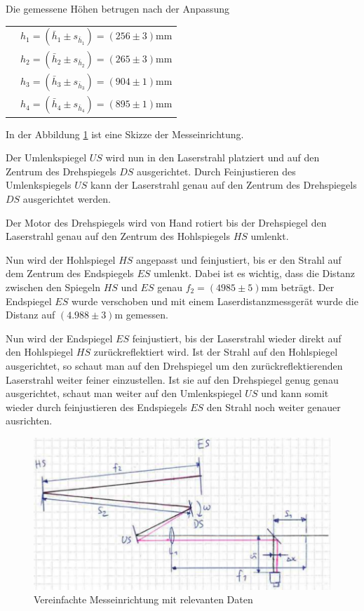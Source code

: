 Die gemessene H\"ohen betrugen nach der Anpassung

\begin{tabular}{ll}
    \hspace{4mm}
    & $h_1 = (\bar{h}_1 \pm s_{\bar{h}_1}) = (256\pm3)\textrm{mm}$ \\
    & $h_2 = (\bar{h}_2 \pm s_{\bar{h}_2}) = (265\pm3)\textrm{mm}$ \\
    & $h_3 = (\bar{h}_3 \pm s_{\bar{h}_3}) = (904\pm1)\textrm{mm}$ \\
    & $h_4 = (\bar{h}_4 \pm s_{\bar{h}_4}) = (895\pm1)\textrm{mm}$ \\
\end{tabular}

In   der   Abbildung   \ref{fig:setup}  ist  eine  Skizze  der  Messeinrichtung.

Der Umlenkspiegel $US$ wird nun in den Laserstrahl platziert und auf den Zentrum
des  Drehspiegels $DS$ ausgerichtet. Durch Feinjustieren des Umlenkspiegels $US$
kann  der  Laserstrahl  genau auf den Zentrum des Drehspiegels $DS$ ausgerichtet
werden.

Der  Motor  des  Drehspiegels  wird  von  Hand  rotiert  bis der Drehspiegel den
Laserstrahl   genau   auf   den   Zentrum   des   Hohlspiegels   $HS$   umlenkt.

Nun  wird der Hohlspiegel $HS$ angepasst und feinjustiert, bis er den Strahl auf
dem Zentrum des Endspiegels $ES$ umlenkt. Dabei ist es wichtig, dass die Distanz
zwischen  den  Spiegeln  $HS$  und  $ES$  genau  $f_2  =  (4985\pm5)\textrm{mm}$
betr\"agt.    Der    Endspiegel    $ES$   wurde   verschoben   und   mit   einem
Laserdistanzmessger\"at  wurde die Distanz auf $(4.988\pm3)\textrm{m}$ gemessen.

Nun wird der Endspiegel $ES$ feinjustiert, bis der Laserstrahl wieder direkt auf
den   Hohlspiegel   $HS$  zur\"uckreflektiert  wird.  Ist  der  Strahl  auf  den
Hohlspiegel   ausgerichtet,   so   schaut   man   auf  den  Drehspiegel  um  den
zur\"uckreflektierenden  Laserstrahl weiter feiner einzustellen. Ist sie auf den
Drehspiegel  genug  genau  ausgerichtet, schaut man weiter auf den Umlenkspiegel
$US$  und  kann somit wieder durch feinjustieren des Endspiegels $ES$ den Strahl
noch weiter genauer ausrichten.

\begin{figure}[H]
    \center
    \includegraphics[width=\textwidth]{images/setup.pdf}
    \caption{Vereinfachte Messeinrichtung mit relevanten Daten}
    \label{fig:setup}
\end{figure}


